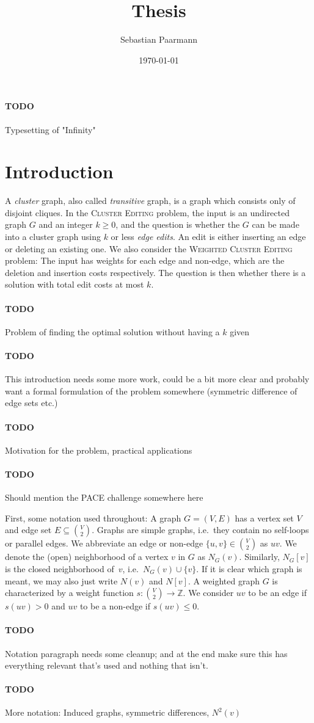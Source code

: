 \documentclass{article}
\title{Thesis}
\author{Sebastian Paarmann}
\date\today
\newcommand{\todo}[1]{\paragraph{TODO} #1}
\theoremstyle{definition}
\begin{document}
\maketitle

\tableofcontents

\todo Typesetting of "Infinity"

\section{Introduction}

A \emph{cluster} graph, also called \emph{transitive} graph, is a graph which consists only of
disjoint cliques.  In the \textsc{Cluster Editing} problem, the input is an undirected graph $G$ and
an integer $k \geq 0$, and the question is whether the $G$ can be made into a cluster graph using
$k$ or less \emph{edge edits}. An edit is either inserting an edge or deleting an existing one. We
also consider the \textsc{Weighted Cluster Editing} problem: The input has weights for each edge and
non-edge, which are the deletion and insertion costs respectively. The question is then whether
there is a solution with total edit costs at most $k$.

\todo Problem of finding the optimal solution without having a $k$ given

\todo This introduction needs some more work, could be a bit more clear and probably want a
formal formulation of the problem somewhere (symmetric difference of edge sets etc.)

\todo Motivation for the problem, practical applications

\todo Should mention the PACE challenge somewhere here

First, some notation used throughout: A graph $G = (V, E)$ has a vertex set $V$ and edge set $E
\subseteq \binom{V}{2}$. Graphs are simple graphs, i.e.\ they contain no self-loops or parallel
edges.  We abbreviate an edge or non-edge $\{u, v\} \in \binom{V}{2}$ as $uv$. We denote the (open)
neighborhood of a vertex $v$ in $G$ as $N_G(v)$. Similarly, $N_G[v]$ is the closed neighborhood
of~$v$, i.e.\ $N_G(v) \cup \{v\}$. If it is clear which graph is meant, we may also just write
$N(v)$ and $N[v]$.  A weighted graph $G$ is characterized by a weight function $s\colon \binom{V}{2}
\to \mathbb{Z}$. We consider $uv$ to be an edge if $s(uv) > 0$ and $uv$ to be a non-edge if $s(uv)
\leq 0$.

\todo Notation paragraph needs some cleanup; and at the end make sure this has everything relevant
that's used and nothing that isn't.
\todo More notation: Induced graphs, symmetric differences, $N^2(v)$
\end{document}

